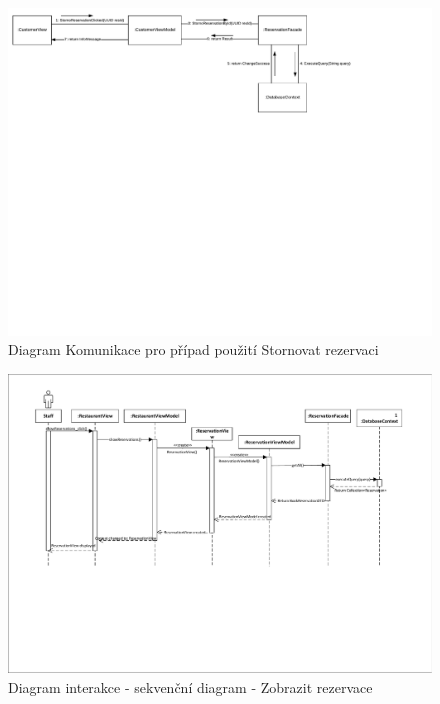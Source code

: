 \newpage
\begin{figure}[h!]
\begin{center}
\includegraphics[scale=0.5]{../02_Vysledne_modely/09_1_CommunicationDiagram.pdf}
\vspace{150pt}
\caption{Diagram Komunikace pro případ použití Stornovat rezervaci}
\label{fig:communication09-1}
\end{center}
\end{figure}    

\newpage
\begin{figure}[h!]
\begin{center}
\includegraphics[scale=0.5]{../02_Vysledne_modely/09_1_InteractionDiagram_SequenceDiagram_ShowReservations.pdf}
\vspace{150pt}
\caption{Diagram interakce - sekvenční diagram - Zobrazit rezervace}
\label{fig:communication09-1}
\end{center}
\end{figure}


